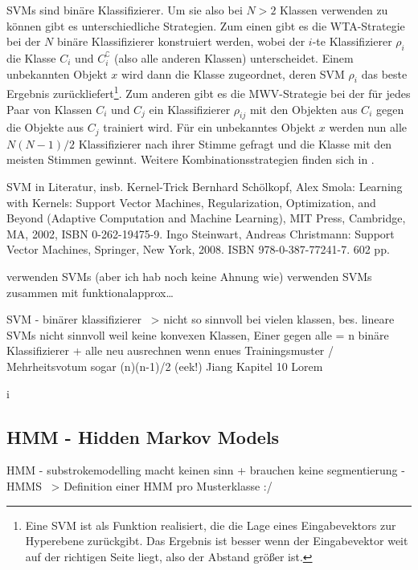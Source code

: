 \ac{SVM}s sind binäre Klassifizierer. Um sie also bei $N>2$ Klassen verwenden zu können gibt es unterschiedliche Strategien. Zum einen gibt es die \ac{WTA}-Strategie bei der $N$ binäre Klassifizierer konstruiert werden, wobei der $i$-te Klassifizierer $\rho_i$ die Klasse $C_i$ und $C_i^{\complement}$ (also alle anderen Klassen) unterscheidet. Einem unbekannten Objekt $x$ wird dann die Klasse zugeordnet, deren SVM $\rho_i$ das beste Ergebnis zurückliefert\footnote{Eine SVM ist als Funktion realisiert, die die Lage eines Eingabevektors zur Hyperebene zurückgibt. Das Ergebnis ist besser wenn der Eingabevektor weit auf der richtigen Seite liegt, also der Abstand größer ist.}. Zum anderen gibt es die \ac{MWV}-Strategie bei der für jedes Paar von Klassen $C_i$ und $C_j$ ein Klassifizierer $\rho_{ij}$ mit den Objekten aus $C_i$ gegen die Objekte aus $C_j$ trainiert wird. Für ein unbekanntes Objekt $x$ werden nun alle $N(N-1)/2$ Klassifizierer nach ihrer Stimme gefragt und die Klasse mit den meisten Stimmen gewinnt. Weitere Kombinationsstrategien finden sich in \cite{Duan:2005p11426}.

\TODO SVM in Literatur, insb. Kernel-Trick
Bernhard Schölkopf, Alex Smola: Learning with Kernels: Support Vector Machines, Regularization, Optimization, and Beyond (Adaptive Computation and Machine Learning), MIT Press, Cambridge, MA, 2002, ISBN 0-262-19475-9.
Ingo Steinwart, Andreas Christmann: Support Vector Machines, Springer, New York, 2008. ISBN 978-0-387-77241-7. 602 pp.

\citet{Tapia:2003p11202,Tapia:2005p11236} verwenden \ac{SVM}s (aber ich hab noch keine Ahnung wie) 
\citet{Golubitsky:2009p2456} verwenden \ac{SVM}s zusammen mit funktionalapprox\dots \TODO


SVM - binärer klassifizierer ~> nicht so sinnvoll bei vielen klassen, bes. lineare SVMs nicht sinnvoll weil keine konvexen Klassen, Einer gegen alle = n binäre Klassifizierer + alle neu ausrechnen wenn enues Trainingsmuster / Mehrheitsvotum sogar (n)(n-1)/2 (eek!) Jiang Kapitel 10
Lorem

i%
\subsection[HMM]{HMM - Hidden Markov Models}
\label{sub:hmm}

HMM - substrokemodelling macht keinen sinn + brauchen keine segmentierung
- HMMS ~> Definition einer HMM pro Musterklasse :/
\cite{Fitzgerald:2005p331}

